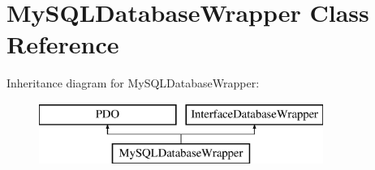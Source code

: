 \hypertarget{class_david_fricker_1_1_data_abstracter_1_1_my_s_q_l_database_wrapper}{}\section{My\+S\+Q\+L\+Database\+Wrapper Class Reference}
\label{class_david_fricker_1_1_data_abstracter_1_1_my_s_q_l_database_wrapper}
Inheritance diagram for My\+S\+Q\+L\+Database\+Wrapper\+:\begin{figure}[H]
\begin{center}
\leavevmode
\includegraphics[height=2.000000cm]{class_david_fricker_1_1_data_abstracter_1_1_my_s_q_l_database_wrapper}
\end{center}
\end{figure}
